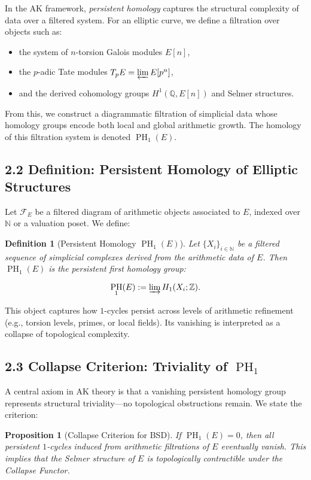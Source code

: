 \documentclass[11pt]{article}
\newtheorem{definition}[theorem]{Definition}
\newtheorem{proposition}[theorem]{Proposition}
\DeclareMathOperator{\PH}{PH}
\newcommand{\QQ}{\mathbb{Q}}
\newcommand{\ZZ}{\mathbb{Z}}
\begin{document}
In the AK framework, \emph{persistent homology} captures the structural complexity of data over a filtered system.  
For an elliptic curve, we define a filtration over objects such as:

\begin{itemize}
  \item the system of $n$-torsion Galois modules $E[n]$,
  \item the $p$-adic Tate modules $T_p E = \varprojlim E[p^n]$,
  \item and the derived cohomology groups $H^1(\QQ, E[n])$ and Selmer structures.
\end{itemize}

From this, we construct a diagrammatic filtration of simplicial data whose homology groups encode both local and global arithmetic growth. The homology of this filtration system is denoted $\PH_1(E)$.

\subsection{2.2 Definition: Persistent Homology of Elliptic Structures}

Let $\mathcal{F}_E$ be a filtered diagram of arithmetic objects associated to $E$, indexed over $\mathbb{N}$ or a valuation poset.  
We define:

\begin{definition}[Persistent Homology $\PH_1(E)$]
Let $\{X_i\}_{i \in \mathbb{N}}$ be a filtered sequence of simplicial complexes derived from the arithmetic data of $E$.  
Then $\PH_1(E)$ is the persistent first homology group:

\[
\PH_1(E) := \varinjlim H_1(X_i; \ZZ).
\]
\end{definition}

This object captures how $1$-cycles persist across levels of arithmetic refinement (e.g., torsion levels, primes, or local fields).  
Its vanishing is interpreted as a collapse of topological complexity.

\subsection{2.3 Collapse Criterion: Triviality of $\PH_1$}

A central axiom in AK theory is that a vanishing persistent homology group represents structural triviality—no topological obstructions remain.  
We state the criterion:

\begin{proposition}[Collapse Criterion for BSD]
\label{prop:collapse-criterion}
If $\PH_1(E) = 0$, then all persistent $1$-cycles induced from arithmetic filtrations of $E$ eventually vanish.  
This implies that the Selmer structure of $E$ is topologically contractible under the Collapse Functor.
\end{proposition}
\end{document}
